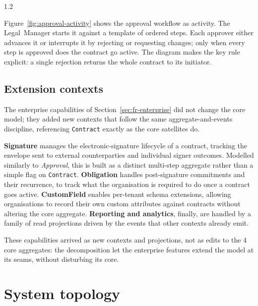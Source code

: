 \begin{spacing}{1.2}

Figure~\ref{fig:approval-activity} shows the approval workflow as activity.
The Legal~Manager starts it against a template of ordered steps. Each
approver either advances it or interrupts it by rejecting or requesting
changes; only when every step is approved does the contract go active. The
diagram makes the key rule explicit: a single rejection returns the whole
contract to its initiator.


\subsection{Extension contexts}
\label{sec:extension-contexts}

The enterprise capabilities of Section~\ref{sec:fr-enterprise} did not change
the core model; they added new contexts that follow the same aggregate-and-events
discipline, referencing \texttt{Contract} exactly as the core satellites do.

\textbf{Signature} manages the electronic-signature lifecycle of a contract, tracking 
the envelope sent to external counterparties and individual signer outcomes. Modelled
similarly to \emph{Approval}, this is built as a distinct multi-step aggregate rather
than a simple flag on \texttt{Contract}. \textbf{Obligation} handles post-signature 
commitments and their recurrence, to track what the organisation is required to do once a
contract goes active. \textbf{CustomField} enables per-tenant schema extensions, 
allowing organisations to record their own custom attributes against contracts without
altering the core aggregate. \textbf{Reporting and analytics}, finally, are handled by a family of read projections driven 
by the events that other contexts already emit. 

These capabilities arrived as new contexts and projections, not as edits to the 4
core aggregates: the decomposition let the enterprise features extend the model at its seams,
without disturbing its core.

\section{System topology}
\label{sec:topology}


\end{spacing}
